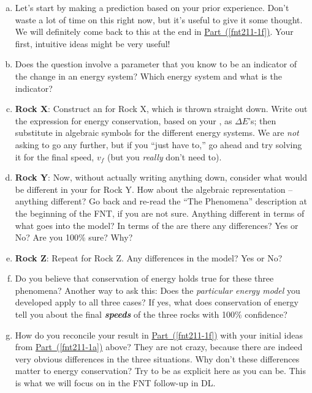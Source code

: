 \begin{enumerate}[(a)]
	\item Let's start by making a prediction based on your prior experience. Don't waste a lot of time on this right now, but it's useful to give it some thought. We will definitely come back to this at the end in \hyperref[fnt211-1f]{Part~(\ref*{fnt211-1f})}. Your first, intuitive ideas might be very useful!
	\label{fnt211-1a}
	
	\item Does the question involve a parameter that you know to be an indicator of the change in an energy system? Which energy system and what is the indicator?
	\label{fnt211-1b}
	
	\item \textbf{Rock X}: Construct an \EnergyDiagram{} for Rock X, which is thrown straight down. Write out the expression for energy conservation, based on your \EnergyDiagram{}, as $\Delta E$'s; then substitute in algebraic symbols for the different energy systems. We are \emph{not} asking to go any further, but if you ``just have to,'' go ahead and try solving it for the final speed, $v_f$ (but you \emph{really} don't need to).
	\label{fnt211-1c}
	
	\item \textbf{Rock Y}: Now, without actually writing anything down, consider what would be different in your \EnergyDiagram{} for Rock Y. How about the algebraic representation -- anything different?  Go back and re-read the ``The Phenomena'' description at the beginning of the FNT, if you are not sure. Anything different in terms of what goes into the model? In terms of the \EnergyInteractionModel{} are there any differences?  Yes or No? Are you 100\% sure? Why?
	\label{fnt211-1d}
	
	\item \textbf{Rock Z}: Repeat for Rock Z. Any differences in the model?  Yes or No?
	\label{fnt211-1e}
	
	\item Do you believe that conservation of energy holds true for these three phenomena? Another way to ask this: Does the {\em particular energy model} you developed apply to all three cases?  If yes, what does conservation of energy tell you about the final \textbf{\em speeds} of the three rocks with 100\% confidence?
	\label{fnt211-1f}
	
	\item How do you reconcile your result in \hyperref[fnt211-1f]{Part~(\ref*{fnt211-1f})} with your initial ideas from \hyperref[fnt211-1a]{Part~(\ref*{fnt211-1a})} above?  They are not crazy, because there are indeed very obvious differences in the three situations. Why don't these differences matter to energy conservation?  Try to be as explicit here as you can be. This is what we will focus on in the FNT follow-up in DL.
	\label{fnt211-1g}
\end{enumerate}